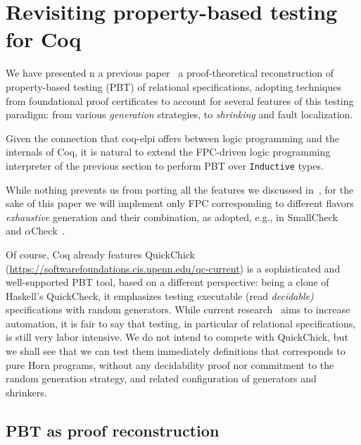 \section{Revisiting property-based testing for Coq}

We have presented n a previous paper~\cite{blanco19ppdp} a
proof-theoretical reconstruction of property-based testing (PBT) of
relational specifications, adopting techniques from foundational proof
certificates to account for several features of this testing
paradigm: from various \emph{generation} strategies, to
\emph{shrinking} and fault localization.

Given the connection that \textsf{coq-elpi} offers between logic
programming and the internals of Coq, it is natural to extend the
FPC-driven logic programming interpreter of the previous section to
perform PBT over \lstinline{Inductive} types.

While nothing prevents us from porting all the features we discussed
in~\cite{blanco19ppdp}, for the sake of this paper we will implement
only FPC corresponding to different flavors \emph{exhaustive}
generation and their combination, as adopted, e.g., in
SmallCheck~\cite{smallcheck} and
$\alpha$Check~\cite{cheney_momigliano_2017}.

Of course, Coq already features \textsf{QuickChick}~\cite{QChick}
(\url{https://softwarefoundations.cis.upenn.edu/qc-current}) is a
sophisticated and well-supported PBT tool, based on a different
perspective: being a clone of Haskell's QuickCheck, it emphasizes
testing executable (read \emph{decidable)} specifications with random
generators. While current research~\cite{LampropoulosPP18} aims to
increase automation, it is fair to say that testing, in particular of
relational specifications, is still very labor intensive. We do not
intend to compete with \textsf{QuickChick}, but we shall see that we
can test them immediately  definitions that
corresponds to pure Horn programs, without any decidability proof nor
commitment to the random generation strategy, and related
configuration of generators and shrinkers.


\subsection{PBT as proof reconstruction}
\label{ssec:pbt-lp}


